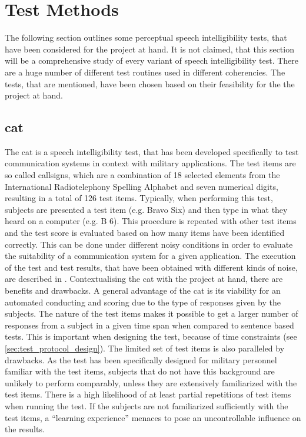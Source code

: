 \section{Test Methods}\label{sec:methods}
The following section outlines some perceptual speech intelligibility tests, that have been considered for the project at hand. It is not claimed, that this section will be a comprehensive study of every variant of speech intelligibility test. There are a huge number of different test routines used in different coherencies. The tests, that are mentioned, have been chosen based on their feasibility for the the project at hand.

\subsection{\gls{cat}}\label{ssec:cat}
The \gls{cat} is a speech intelligibility test, that has been developed specifically to test communication systems in context with military applications. The test items are so called callsigns, which are a combination of 18 selected elements from the International Radiotelephony Spelling Alphabet and seven numerical digits, resulting in a total of 126 test items.
Typically, when performing this test, subjects are presented a test item (e.g. Bravo Six) and then type in what they heard on a computer (e.g. B 6). This procedure is repeated with other test items and the test score is evaluated based on how many items have been identified correctly.
This can be done under different noisy conditions in order to evaluate the suitability of a communication system for a given application.
The execution of the test and test results, that have been obtained with different kinds of noise, are described in \citep{rao_2006}.
Contextualising the \gls{cat} with the project at hand, there are benefits and drawbacks. A general advantage of the \gls{cat} is its viability for an automated conducting and scoring due to the type of responses given by the subjects. The nature of the test items makes it possible to get a larger number of responses from a subject in a given time span when compared to sentence based tests.
This is important when designing the test, because of time constraints (see \autoref{sec:test_protocol_design}).
The limited set of test items is also paralleled by drawbacks. As the test has been specifically designed for military personnel familiar with the test items, subjects that do not have this background are unlikely to perform comparably, unless they are extensively familiarized with the test items. There is a high likelihood of at least partial repetitions of test items when running the test. If the subjects are not familiarized sufficiently with the test items, a \enquote{learning experience} menaces to pose an uncontrollable influence on the results.

